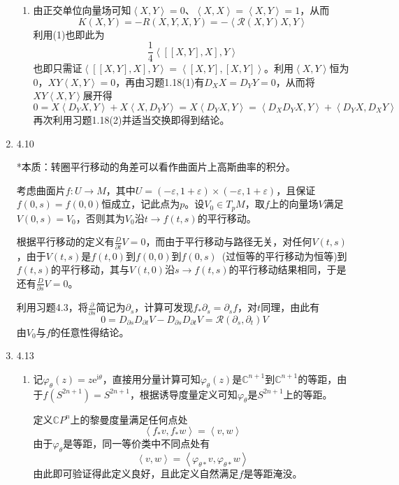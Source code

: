 \documentclass[a4paper,UTF8,fontset=windows,10pt]{ctexart}
\newcommand*{\er}{\mathrm{e}}
\begin{document}
\begin{enumerate}
\begin{enumerate}[(1)]
        \item 由正交单位向量场可知$\left<X,Y\right>=0$、$\left<X,X\right>=\left<X,Y\right>=1$，从而
        $$K(X,Y)=-R(X,Y,X,Y)=-\left<\mathcal{R}(X,Y)X,Y\right>$$
        利用(1)也即此为
        $$\frac{1}{4}\left<[[X,Y],X],Y\right>$$
        也即只需证$\left<[[X,Y],X],Y\right>=\left<[X,Y],[X,Y]\right>$。利用$\left<X,Y\right>$恒为0，$XY\left<X,Y\right>=0$，再由习题1.18(1)有$D_XX=D_YY=0$，从而将$XY\left<X,Y\right>$展开得
        $$0=X\left<D_YX,Y\right>+X\left<X,D_YY\right>=X\left<D_YX,Y\right>=\left<D_XD_YX,Y\right>+\left<D_YX,D_XY\right>$$
        再次利用习题1.18(2)并适当交换即得到结论。
    \end{enumerate}
    
    \item 4.10
    
    *本质：转圈平行移动的角差可以看作曲面片上高斯曲率的积分。
    
    考虑曲面片$f:U\to M$，其中$U=(-\varepsilon,1+\varepsilon)\times(-\varepsilon,1+\varepsilon)$，且保证$f(0,s)=f(0,0)$恒成立，记此点为$p$。设$V_0\in T_pM$，取$f$上的向量场$V$满足$V(0,s)=V_0$，否则其为$V_0$沿$t\to f(t,s)$的平行移动。
    
    根据平行移动的定义有$\frac{D}{\partial t}V=0$，而由于平行移动与路径无关，对任何$V(t,s)$，由于$V(t,s)$是$f(t,0)$到$f(0,0)$到$f(0,s)$\ (过恒等的平行移动为恒等)到$f(t,s)$的平行移动，其与$V(t,0)$沿$s\to f(t,s)$的平行移动结果相同，于是还有$\frac{D}{\partial s}V=0$。
    
    利用习题4.3，将$\frac{\partial}{\partial s}$简记为$\partial_s$，计算可发现$f_*\partial_s=\partial_sf$，对$t$同理，由此有
    $$0=D_{\partial s}D_{\partial t}V-D_{\partial s}D_{\partial t}V=\mathcal{R}(\partial_s,\partial_t)V$$
    由$V_0$与$f$的任意性得结论。
    
    
    \item 4.13
    \begin{enumerate}[(1)]
        \item 记$\varphi_\theta(z)=z\er^{\mathrm{i}\theta}$，直接用分量计算可知$\varphi_\theta(z)$是$\mathbb{C}^{n+1}$到$\mathbb{C}^{n+1}$的等距，由于$f(S^{2n+1})=S^{2n+1}$，根据诱导度量定义可知$\varphi_\theta$是$S^{2n+1}$上的等距。
        
        定义$\mathbb{C}P^n$上的黎曼度量满足任何点处
        $$\left<f_*v,f_*w\right>=\left<v,w\right>$$
        由于$\varphi_\theta$是等距，同一等价类中不同点处有
        $$\left<v,w\right>=\left<\varphi_{\theta*}v,\varphi_{\theta*}w\right>$$
        由此即可验证得此定义良好，且此定义自然满足$f$是等距淹没。
    

\end{enumerate}
\end{enumerate}
\end{document}

